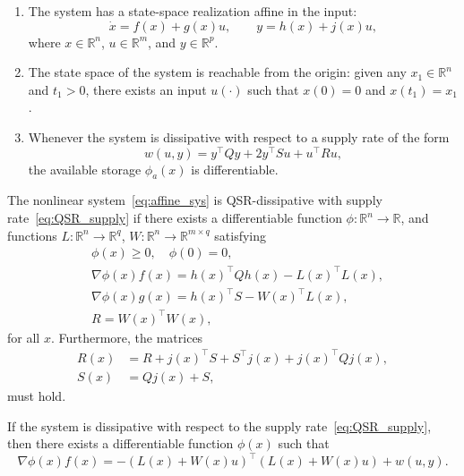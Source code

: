 \begin{enumerate}
    \item The system has a state-space realization affine in the input:
    \begin{equation}\label{eq:affine_sys}
    \dot{x} = f(x) + g(x)u, 
    \qquad y = h(x) + j(x)u,
    \end{equation}
    where $x \in \mathbb{R}^n$, $u \in \mathbb{R}^m$, and $y \in \mathbb{R}^p$.
    
    \item The state space of the system is reachable from the origin:  
    given any $x_1 \in \mathbb{R}^n$ and $t_1 > 0$, there exists an input $u(\cdot)$ such that 
    $x(0) = 0$ and $x(t_1) = x_1$.
    
    \item Whenever the system is dissipative with respect to a supply rate of the form
    \begin{equation}\label{eq:QSR_supply}
    w(u,y) = y^\top Q y + 2 y^\top S u + u^\top R u,
    \end{equation}
    the available storage $\phi_a(x)$ is differentiable.
\end{enumerate}

\begin{theorem}\label{thm:algebraic_dissipativity}
The nonlinear system~\eqref{eq:affine_sys} is QSR-dissipative with supply rate~\eqref{eq:QSR_supply} 
if there exists a differentiable function $\phi : \mathbb{R}^n \to \mathbb{R}$, 
and functions $L : \mathbb{R}^n \to \mathbb{R}^q$, $W : \mathbb{R}^n \to \mathbb{R}^{m \times q}$ 
satisfying
\begin{align}
    & \phi(x) \ge 0, \quad \phi(0) = 0, \label{eq:phi_nonneg}\\
    & \nabla \phi(x) f(x) = h(x)^\top Q h(x) - L(x)^\top L(x), \label{eq:phi_f}\\
    & \nabla \phi(x) g(x) = h(x)^\top S - W(x)^\top L(x), \label{eq:phi_g}\\
    & R = W(x)^\top W(x), \label{eq:R_W}
\end{align}
for all $x$. Furthermore, the matrices
\begin{align}
    R(x) &= R + j(x)^\top S + S^\top j(x) + j(x)^\top Q j(x), \label{eq:R_x}\\
    S(x) &= Q j(x) + S, \label{eq:S_x}
\end{align}
must hold.
\end{theorem}

\begin{corollary}\label{cor:diff_dissipation}
If the system is dissipative with respect to the supply rate~\eqref{eq:QSR_supply}, 
then there exists a differentiable function $\phi(x)$ such that
\begin{equation}\label{eq:diff_dissipation}
\nabla \phi(x) f(x) = - (L(x) + W(x) u)^\top (L(x) + W(x) u) + w(u,y).
\end{equation}
\end{corollary}

